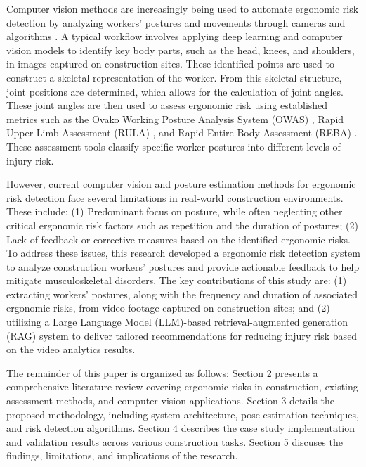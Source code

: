 \documentclass[11pt]{article}
\begin{document}
Computer vision methods are increasingly being used to automate ergonomic risk detection by analyzing workers' postures and movements through cameras and algorithms \citep{seo2021automated}. A typical workflow involves applying deep learning and computer vision models to identify key body parts, such as the head, knees, and shoulders, in images captured on construction sites. These identified points are used to construct a skeletal representation of the worker. From this skeletal structure, joint positions are determined, which allows for the calculation of joint angles. These joint angles are then used to assess ergonomic risk using established metrics such as the Ovako Working Posture Analysis System (OWAS) \citep{karhu1977correcting}, Rapid Upper Limb Assessment (RULA) \citep{mcatamney1993rula}, and Rapid Entire Body Assessment (REBA) \citep{hignett2000rapid}. These assessment tools classify specific worker postures into different levels of injury risk.

However, current computer vision and posture estimation methods for ergonomic risk detection face several limitations in real-world construction environments. These include: (1) Predominant focus on posture, while often neglecting other critical ergonomic risk factors such as repetition and the duration of postures; (2) Lack of feedback or corrective measures based on the identified ergonomic risks. To address these issues, this research developed a ergonomic risk detection system to analyze construction workers’ postures and provide actionable feedback to help mitigate musculoskeletal disorders. The key contributions of this study are: (1) extracting workers' postures, along with the frequency and duration of associated ergonomic risks, from video footage captured on construction sites; and (2) utilizing a Large Language Model (LLM)-based retrieval-augmented generation (RAG) system to deliver tailored recommendations for reducing injury risk based on the video analytics results.

The remainder of this paper is organized as follows: Section 2 presents a comprehensive literature review covering ergonomic risks in construction, existing assessment methods, and computer vision applications. Section 3 details the proposed methodology, including system architecture, pose estimation techniques, and risk detection algorithms. Section 4 describes the case study implementation and validation results across various construction tasks. Section 5 discuses the findings, limitations, and implications of the research. 
\end{document}
